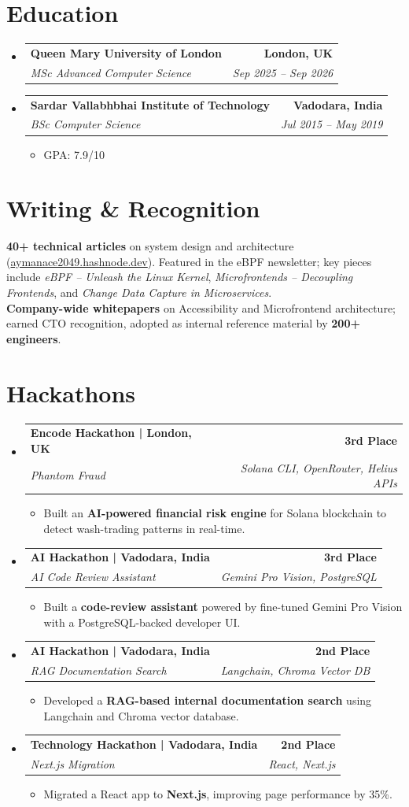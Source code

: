 \documentclass[letterpaper,11pt]{article}
\makeatletter
\newcommand{\resumeItem}[1]{
  \item\small{
    {#1 \vspace{-3pt}}
  }
}
\newcommand{\resumeSubheading}[4]{
  \vspace{-3pt}\item
    \begin{tabular*}{1.0\textwidth}[t]{l@{\extracolsep{\fill}}r}
      \textbf{#1} & \textbf{\small #2} \\
      \textit{\small#3} & \textit{\small #4} \\
    \end{tabular*}\vspace{-7pt}
}
\newcommand{\resumeSubHeadingListStart}{\begin{itemize}[leftmargin=0.0in, label={}]}
\newcommand{\resumeSubHeadingListEnd}{\end{itemize}}
\newcommand{\resumeItemListStart}{\begin{itemize}}
\newcommand{\resumeItemListEnd}{\end{itemize}\vspace{0pt}}
\makeatother
\begin{document}
\section{Education}
  \resumeSubHeadingListStart
    \resumeSubheading
      {Queen Mary University of London}{London, UK}
      {MSc Advanced Computer Science}{Sep 2025 -- Sep 2026}
    \resumeSubheading
      {Sardar Vallabhbhai Institute of Technology}{Vadodara, India}
      {BSc Computer Science}{Jul 2015 -- May 2019}
      \resumeItemListStart
        \resumeItem{GPA: 7.9/10}
      \resumeItemListEnd
  \resumeSubHeadingListEnd

\section{Writing \& Recognition}
\small
\textbf{40+ technical articles} on system design and architecture (\href{https://aymanace2049.hashnode.dev}{aymanace2049.hashnode.dev}). Featured in the eBPF newsletter; key pieces include \textit{eBPF -- Unleash the Linux Kernel}, \textit{Microfrontends -- Decoupling Frontends}, and \textit{Change Data Capture in Microservices}. \\[3pt]
\textbf{Company-wide whitepapers} on Accessibility and Microfrontend architecture; earned CTO recognition, adopted as internal reference material by \textbf{200+ engineers}.

\section{Hackathons}
\resumeSubHeadingListStart
    \resumeSubheading
      {Encode Hackathon | London, UK}{3rd Place}
      {Phantom Fraud}{Solana CLI, OpenRouter, Helius APIs}
      \resumeItemListStart
        \resumeItem{Built an \textbf{AI-powered financial risk engine} for Solana blockchain to detect wash-trading patterns in real-time.}
      \resumeItemListEnd
    \resumeSubheading
      {AI Hackathon | Vadodara, India}{3rd Place}
      {AI Code Review Assistant}{Gemini Pro Vision, PostgreSQL}
      \resumeItemListStart
        \resumeItem{Built a \textbf{code-review assistant} powered by fine-tuned Gemini Pro Vision with a PostgreSQL-backed developer UI.}
      \resumeItemListEnd
    \resumeSubheading
      {AI Hackathon | Vadodara, India}{2nd Place}
      {RAG Documentation Search}{Langchain, Chroma Vector DB}
      \resumeItemListStart
        \resumeItem{Developed a \textbf{RAG-based internal documentation search} using Langchain and Chroma vector database.}
      \resumeItemListEnd
    \resumeSubheading
      {Technology Hackathon | Vadodara, India}{2nd Place}
      {Next.js Migration}{React, Next.js}
      \resumeItemListStart
        \resumeItem{Migrated a React app to \textbf{Next.js}, improving page performance by 35\%.}
      \resumeItemListEnd
\resumeSubHeadingListEnd
\end{document}
